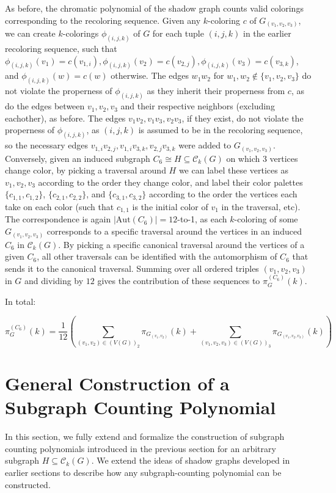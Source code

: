 \documentclass[12pt,reqno,dvipsnames]{amsart}
\theoremstyle{definition}
\begin{document}
As before, the chromatic polynomial of the shadow graph counts valid colorings corresponding to the recoloring sequence. Given any $k$-coloring $c$ of $G_{(v_1,v_2,v_3)}$, we can create $k$-colorings $\phi_{(i,j,k)}$ of $G$ for each tuple $(i,j,k)$ in the earlier recoloring sequence, such that $\phi_{(i,j,k)}(v_1)=c(v_{1,i}),\phi_{(i,j,k)}(v_2)=c(v_{2,j}),\phi_{(i,j,k)}(v_3)=c(v_{3,k})$, and $\phi_{(i,j,k)}(w)=c(w)$ otherwise. The edges $w_1w_2$ for $w_1,w_2\notin \{v_1,v_2,v_3\}$ do not violate the properness of $\phi_{(i,j,k)}$ as they inherit their properness from $c$, as do the edges between $v_1,v_2,v_3$ and their respective neighbors (excluding eachother), as before. The edges $v_1v_2,v_1v_3,v_2v_3$, if they exist, do not violate the properness of $\phi_{(i,j,k)}$, as $(i,j,k)$ is assumed to be in the recoloring sequence, so the necessary edges $v_{1,i}v_{2,j}, v_{1,i}v_{3,k},v_{2,j}v_{3,k}$ were added to $G_{(v_1,v_2,v_3)}$. Conversely, given an induced subgraph $C_6\cong H\subseteq \mathcal{C}_k(G)$ on which 3 vertices change color, by picking a traversal around $H$ we can label these vertices as $v_1,v_2,v_3$ according to the order they change color, and label their color palettes $\{c_{1,1},c_{1,2}\}$, $\{c_{2,1},c_{2,2}\}$, and $\{c_{3,1},c_{3,2}\}$ according to the order the vertices each take on each color (such that $c_{1,1}$ is the initial color of $v_1$ in the traversal, etc). The correspondence is again $|\text{Aut}(C_6)| = 12$-to-1, as each $k$-coloring of some $G_{(v_1,v_2,v_3)}$ corresponds to a specific traversal around the vertices in an induced $C_6$ in $\mathcal{C}_k(G)$. By picking a specific canonical traversal around the vertices of a given $C_6$, all other traversals can be identified with the automorphism of $C_6$ that sends it to the canonical traversal. Summing over all ordered triples $(v_1, v_2, v_3)$ in $G$ and dividing by $12$ gives the contribution of these sequences to $\pi_G^{(C_6)}(k)$. 

In total:

$$
\pi_G^{(C_6)}(k) = \frac{1}{12} \left( \sum_{(v_1,v_2) \in (V(G))_2} \pi_{G_{(v_1,v_2)}}(k) + \sum_{(v_1, v_2, v_3) \in (V(G))_3} \pi_{G_{(v_1,v_2,v_3)}}(k) \right)
$$


\section{General Construction of a Subgraph Counting Polynomial}\label{sec:general-shadow}

In this section, we fully extend and formalize the construction of subgraph counting polynomials introduced in the previous section for an arbitrary subgraph $H\subseteq\mathcal{C}_k(G)$. We extend the ideas of shadow graphs developed in earlier sections to describe how any subgraph-counting polynomial can be constructed.
\end{document}
